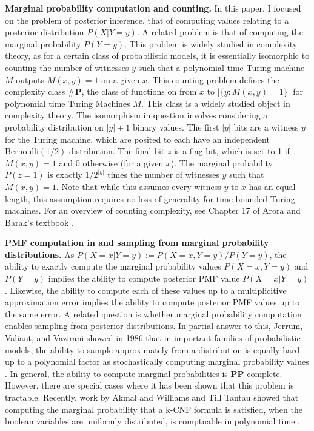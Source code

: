 \documentclass{article}
\renewcommand{\P}{\mathbf{P}}
\def \PP{\P\P}
\theoremstyle{definition}
\theoremstyle{remark}
\begin{document}
\textbf{Marginal probability computation and counting.}
In this paper, I focused on the problem of posterior inference, that of computing values relating to a posterior distribution $P(X | Y = y)$.
A related problem is that of computing the marginal probability $P(Y = y)$.
This problem is widely studied in complexity theory, as for a certain class of probabilistic models, it is essentially isomorphic to counting the number of witnesses $y$ such that a polynomial-time Turing machine $M$ outputs $M(x, y) = 1$ on a given $x$.
This counting problem defines the complexity class $\#\P$, the class of functions on from $x$ to $|\{y : M(x, y) = 1\}|$ for polynomial time Turing Machines $M$. This class is a widely studied object in complexity theory.
The isomorphism in question involves considering a probability distribution on $|y| + 1$ binary values.
The first $|y|$ bits are a witness $y$ for the Turing machine, which are posited to each have an independent $\text{Bernoulli}(1/2)$ distribution.
The final bit $z$ is a flag bit, which is set to 1 if $M(x, y) = 1$ and 0 otherwise (for a given $x$).
The marginal probability $P(z = 1)$ is exactly $1/2^{|y|}$ times the number of witnesses $y$ such that $M(x, y) = 1$.
Note that while this assumes every witness $y$ to $x$ has an equal length, this assumption requires no loss of generality for time-bounded Turing machines.
For an overview of counting complexity, see Chapter 17 of Arora and Barak's textbook \cite{arora2009computational}.

\textbf{PMF computation in and sampling from marginal probability distributions.}
As $P(X = x | Y = y) := P(X = x, Y = y) / P(Y = y)$, the ability to exactly compute the marginal probability values $P(X = x, Y = y)$ and $P(Y = y)$ implies the ability to compute posterior PMF value $P(X = x | Y = y)$.
Likewise, the ability to compute each of these values up to a multiplicitive approximation error implies the ability to compute posterior PMF values up to the same error.
A related question is whether marginal probability computation enables sampling from posterior distributions.
In partial answer to this, Jerrum, Valiant, and Vazirani showed in 1986 that in important families of probabilistic models, the ability to sample approximately from a distribution is equally hard up to a polynomial factor as stochastically computing marginal probability values \cite{jerrum1986}.
In general, the ability to compute marginal probabilities is $\PP$-complete.
However, there are special cases where it has been shown that this problem is tractable.
Recently, work by Akmal and Williams and Till Tantau showed that computing the marginal probability that a k-CNF formula is satisfied, when the boolean variables are uniformly distributed, is comptuable in polynomial time \cite{akmal2022majority,tantau2022satisfaction}.
\end{document}
